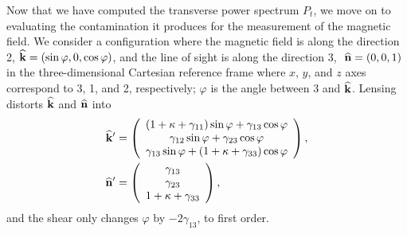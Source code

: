 Now that we have computed the transverse power spectrum $P_t$, we move on to evaluating the contamination it produces for the measurement of the magnetic field. We consider a configuration where the magnetic field is along the direction 2, ${\bf{\widehat k}}=(\sin\varphi,0,\cos\varphi)$, and the line of sight is along the direction 3, $\ {\bf{\widehat n}}=(0,0,1)$ in the three-dimensional Cartesian reference frame where $x$, $y$, and $z$ axes correspond to 3, 1, and 2, respectively; $\varphi$ is the angle between 3 and ${\bf{\widehat k}}$. Lensing distorts ${\bf{\widehat k}}$ and ${\bf{\widehat n}}$ into
\begin{align}
{\bf{\widehat k}}'&=\left(\begin{array}{c}
(1+\kappa+\gamma_{11})\sin\varphi+\gamma_{13}\cos\varphi\\
\gamma_{12}\sin\varphi+\gamma_{23}\cos\varphi\\
\gamma_{13}\sin\varphi+(1+\kappa+\gamma_{33})\cos\varphi
\end{array}\right),\nonumber\\
{\bf{\widehat n}}'&=\left(\begin{array}{c}
\gamma_{13}\\
\gamma_{23}\\
1+\kappa+\gamma_{33}
\end{array}\right),
\label{eq:distorted_kn}
\end{align}
and the shear only changes $\varphi$ by $-2\gamma_{13}$, to first order.

